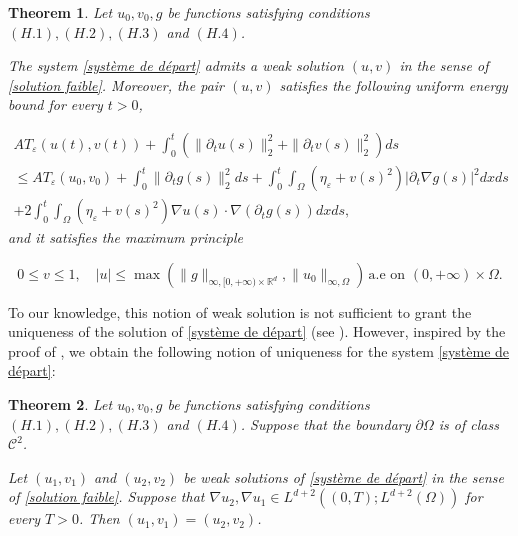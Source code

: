 \documentclass[reqno,12pt,twoside]{amsart}
\newtheorem{theorem}{Theorem}[section]
\numberwithin{equation}{section} \numberwithin{theorem}{section}
\numberwithin{proposition}{section} \numberwithin{lemma}{section}
\numberwithin{corollary}{section}
\numberwithin{definition}{section} \numberwithin{remark}{section}
\begin{document}
\begin{theorem}\label{Theorem 1}
Let $u_0,v_0,g$ be functions satisfying conditions $(H.1), (H.2), (H.3)$ and $(H.4)$. 

\smallskip

The system \eqref{système de départ} admits a weak solution $(u,v)$ in the sense of \autoref{solution faible}. Moreover, the pair $(u,v)$ satisfies the following uniform energy bound for every $t >0$, 

\begin{multline}\label{energy bound thm 1}
AT_\varepsilon (u(t), v(t)) + \int_0^t \left(\|\partial_t u(s)\|_2^2 +\|\partial_t v(s)\|_2^2\right)ds\\
\leqslant AT_\varepsilon (u_0, v_0) +\int_0^t \|\partial_t g (s)\|_2^2 ds + \int_0^t \int_\Omega (\eta_\varepsilon + v(s)^2) |\partial_t \nabla g(s)|^2 dx ds\\
 + 2 \int_0^t \int_\Omega (\eta_\varepsilon + v(s)^2) \nabla u(s) \cdot \nabla (\partial_t g(s))dx ds,
\end{multline}
and it satisfies the maximum principle 

\begin{equation}\label{eq : principe maximum}
0\leqslant v\leqslant 1, \quad |u| \leqslant \max(\|g\|_{\infty, [0,+\infty) \times \mathbb{R}^d}, \|u_0\|_{\infty , \Omega}) \, \text{a.e on } (0,+\infty)\times \Omega .
\end{equation}
\end{theorem}

To our knowledge, this notion of weak solution is not sufficient to grant the uniqueness of the solution of \eqref{système de départ} (see \cite[Remark 2.3]{FP04}). However, inspired by the proof of \cite[Theorem 2.3, Step 3]{FP04}, we obtain the following notion of uniqueness for the system \eqref{système de départ}:

\begin{theorem}\label{Theorem 3}
Let $u_0,v_0,g$ be functions satisfying conditions $(H.1), (H.2), (H.3)$ and $(H.4)$. 
Suppose that the boundary $\partial \Omega$ is of class $\mathcal{C}^2$.

\smallskip

Let $(u_1, v_1)$ and $(u_2, v_2)$ be weak solutions of \eqref{système de départ} in the sense of \autoref{solution faible}. Suppose that $\nabla u_2, \nabla u_1 \in L^{d+2}((0,T); L^{d+2}(\Omega))$ for every $T>0$.   
Then $(u_1 , v_1) = (u_2, v_2)$.
\end{theorem}
\end{document}
